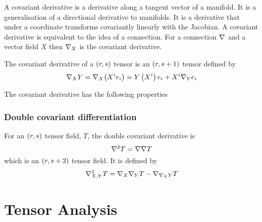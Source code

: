
A covariant derivative is a derivative along a tangent vector of a
manifold. It is a generalisation of a directional derivative to manifolds. It
is a derivative that under a coordinate transforms covariantly \ie linearly
with the Jacobian. A covariant derivative is equivalent to the idea of a
connection. For a connection $  \nabla _{}{} $ and a vector field $X$ then
$\covarderivop{X}{}$ is the covariant derivative. 

The covariant derivative of a $\left( r,s \right)$ tensor is an $\left( r,s+1 \right)$
tensor defined by
\begin{equation}
  \covarderivop{X}{Y}=\covarderivop{X}{\pbrac{X^{i}e_{i}}}=Y\pbrac{X^{i}}e_{i}+X^{i}\covarderivop{Y}{e_{i}}
\end{equation}

The covariant derivative has the following properties

\subsubsection{Double covariant differentiation}

For an $\left( r,s \right)$ tensor field, $T$, the double covariant derivative is
\begin{equation}
  \doublecovarderivop{}{T}=\covarderivop{}{\covarderivop{}{T}}
\end{equation}
which is an $\left( r,s+2 \right)$ tensor field. It is defined by
\begin{equation}
  \doublecovarderivop{X,Y}{T}=\covarderivop{X}{\covarderivop{Y}{T}}-\covarderivop{\connection{X}{Y}}{T}
\end{equation}

\section{Tensor Analysis}
